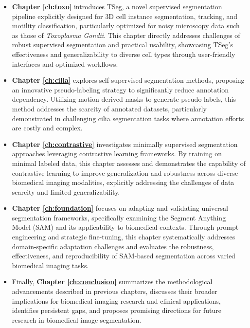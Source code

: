\documentclass[./dissertation.tex]{subfiles}
\begin{document}
\begin{itemize}

    \item \textbf{Chapter \ref{ch:toxo}} introduces TSeg, a novel supervised segmentation pipeline explicitly designed for 3D cell instance segmentation, tracking, and motility classification, particularly optimized for noisy microscopy data such as those of \textit{Toxoplasma Gondii}. This chapter directly addresses challenges of robust supervised segmentation and practical usability, showcasing TSeg's effectiveness and generalizability to diverse cell types through user-friendly interfaces and optimized workflows.

    \item \textbf{Chapter \ref{ch:cilia}} explores self-supervised segmentation methods, proposing an innovative pseudo-labeling strategy to significantly reduce annotation dependency. Utilizing motion-derived masks to generate pseudo-labels, this method addresses the scarcity of annotated datasets, particularly demonstrated in challenging cilia segmentation tasks where annotation efforts are costly and complex.

    \item \textbf{Chapter \ref{ch:contrastive}} investigates minimally supervised segmentation approaches leveraging contrastive learning frameworks. By training on minimal labeled data, this chapter assesses and demonstrates the capability of contrastive learning to improve generalization and robustness across diverse biomedical imaging modalities, explicitly addressing the challenges of data scarcity and limited generalizability.

    \item \textbf{Chapter \ref{ch:foundation}} focuses on adapting and validating universal segmentation frameworks, specifically examining the Segment Anything Model (SAM) and its applicability to biomedical contexts. Through prompt engineering and strategic fine-tuning, this chapter systematically addresses domain-specific adaptation challenges and evaluates the robustness, effectiveness, and reproducibility of SAM-based segmentation across varied biomedical imaging tasks.

    \item Finally, \textbf{Chapter \ref{ch:conclusion}} summarizes the methodological advancements described in previous chapters, discusses their broader implications for biomedical imaging research and clinical applications, identifies persistent gaps, and proposes promising directions for future research in biomedical image segmentation.

\end{itemize}
\end{document}

